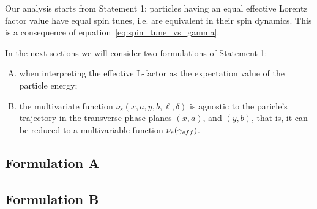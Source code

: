 Our analysis starts from Statement 1: particles having an equal effective Lorentz factor value have equal
spin tunes, i.e. are equivalent in their spin dynamics. This is a consequence of
equation~\eqref{eq:spin_tune_vs_gamma}.

In the next sections we will consider two formulations of Statement 1:
\begin{enumerate}[A.]
	\item when interpreting the effective L-factor as the expectation value of the particle energy;
	\item the multivariate function $\nu_s(x, a, y, b, \ell, \delta)$ is agnostic to the paricle's
          trajectory in the transverse phase planes $(x,a)$, and $(y,b)$, that is, it can be reduced
          to a multivariable function $\nu_s(\g*)$.
\end{enumerate}

\subsection{Formulation A}


\subsection{Formulation B}\label{sec:spin_stune_traj_equ:B_form}


\clearpage
